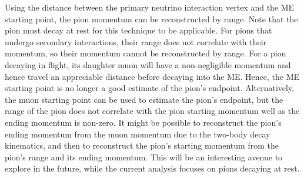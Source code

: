           Using the distance between the primary neutrino interaction vertex and the ME starting point, the pion momentum can be reconstructed by range. 
          Note that the pion must decay at rest for this technique to be applicable. 
          For pions that undergo secondary interactions, their range does not correlate with their momentum, so their momentum cannot be reconstructed by range.
          For a pion decaying in flight, its daughter muon will have a non-negligible momentum and hence travel an appreciable distance before decaying into the ME.
          Hence, the ME starting point is no longer a good estimate of the pion's endpoint.
          Alternatively, the muon starting point can be used to estimate the pion's  endpoint, but the range of the pion does not correlate with the pion starting momentum well as the ending momentum is non-zero.
          It might be possible to reconstruct the pion's ending momentum from the muon momentum due to the two-body decay kinematics, and then to reconstruct the pion's starting momentum from the pion's range and its ending momentum.
          This will be an interesting avenue to explore in the future, while the current analysis focuses on pions decaying at rest.

